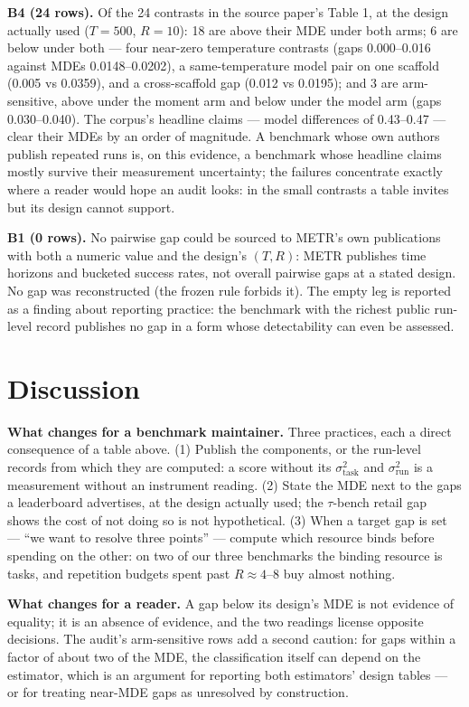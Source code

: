 \documentclass[11pt]{article}
\newcommand{\sT}{\sigma^2_{\mathrm{task}}}
\newcommand{\sR}{\sigma^2_{\mathrm{run}}}
\begin{document}
\textbf{B4 (24 rows).} Of the 24 contrasts in the source paper's
Table 1, at the design actually used ($T = 500$, $R = 10$): 18 are
above their MDE under both arms; 6 are below under both --- four
near-zero temperature contrasts (gaps 0.000--0.016 against MDEs
0.0148--0.0202), a same-temperature model pair on one scaffold (0.005
vs 0.0359), and a cross-scaffold gap (0.012 vs 0.0195); and 3 are
arm-sensitive, above under the moment arm and below under the model
arm (gaps 0.030--0.040). The corpus's headline claims --- model
differences of 0.43--0.47 --- clear their MDEs by an order of
magnitude. A benchmark whose own authors publish repeated runs is, on
this evidence, a benchmark whose headline claims mostly survive their
measurement uncertainty; the failures concentrate exactly where a
reader would hope an audit looks: in the small contrasts a table
invites but its design cannot support.

\textbf{B1 (0 rows).} No pairwise gap could be sourced to METR's own
publications with both a numeric value and the design's $(T, R)$:
METR publishes time horizons and bucketed success rates, not overall
pairwise gaps at a stated design. No gap was reconstructed (the frozen
rule forbids it). The empty leg is reported as a finding about
reporting practice: the benchmark with the richest public run-level
record publishes no gap in a form whose detectability can even be
assessed.

\section{Discussion}

\textbf{What changes for a benchmark maintainer.} Three practices,
each a direct consequence of a table above. (1) Publish the components,
or the run-level records from which they are computed: a score without
its $\sT$ and $\sR$ is a measurement without an instrument reading.
(2) State the MDE next to the gaps a leaderboard advertises, at the
design actually used; the $\tau$-bench retail gap shows the cost of
not doing so is not hypothetical. (3) When a target gap is set ---
``we want to resolve three points'' --- compute which resource binds
before spending on the other: on two of our three benchmarks the
binding resource is tasks, and repetition budgets spent past $R
\approx 4$--$8$ buy almost nothing.

\textbf{What changes for a reader.} A gap below its design's MDE is
not evidence of equality; it is an absence of evidence, and the two
readings license opposite decisions. The audit's arm-sensitive rows
add a second caution: for gaps within a factor of about two of the
MDE, the classification itself can depend on the estimator, which is
an argument for reporting both estimators' design tables --- or for
treating near-MDE gaps as unresolved by construction.
\end{document}
